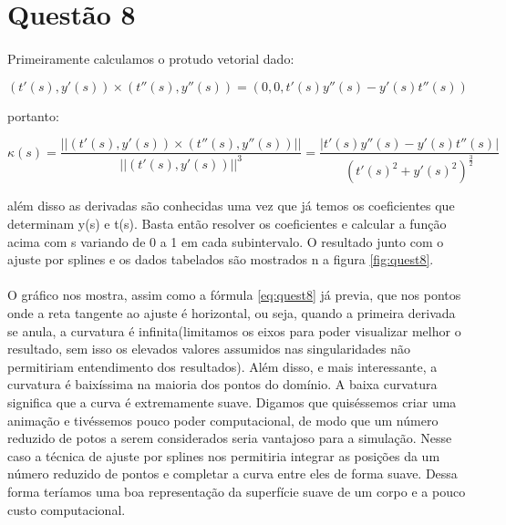 \section*{Questão 8}

\paragraph{} Primeiramente calculamos o protudo vetorial dado:

\begin{equation}
    (t'(s), y'(s)) \times  (t''(s), y''(s)) = (0,0,t'(s)y''(s) - y'(s)t''(s))
\end{equation}

portanto:

\begin{equation}
     \kappa(s) =  \frac{||(t'(s), y'(s)) \times  (t''(s), y''(s))||}{||(t'(s), y'(s))||^{3}} = 
     \frac{|t'(s)y''(s) - y'(s)t''(s)|}{(t'(s)^2 + y'(s)^2)^{\frac{3}{2}}}
    \label{eq:quest8}
\end{equation}

além disso as derivadas são conhecidas uma vez que já temos os coeficientes que determinam
y(s) e t(s). Basta então resolver os coeficientes e calcular a função acima com s variando de 0 a 1
em cada subintervalo. O resultado junto com o ajuste por splines e os dados tabelados são mostrados n
a figura \ref{fig:quest8}.

\paragraph{}O gráfico nos mostra, assim como a fórmula \ref{eq:quest8} já previa, que nos pontos
onde a reta tangente ao ajuste é horizontal, ou seja, quando a primeira derivada se anula, a curvatura
é infinita(limitamos os eixos para poder visualizar melhor o resultado, sem isso os elevados valores
assumidos nas singularidades não permitiriam entendimento dos resultados). Além disso, e mais interessante,
a curvatura é baixíssima na maioria dos pontos do domínio. A baixa curvatura significa que a curva é extremamente
suave. Digamos que quiséssemos criar uma animação e tivéssemos pouco poder computacional, de modo que um número
reduzido de potos a serem considerados seria vantajoso para a simulação. Nesse caso a técnica de ajuste por splines
nos permitiria integrar as posições da um número reduzido de pontos e completar a curva entre eles de forma suave.
Dessa forma teríamos uma boa representação da superfície suave de um corpo e a pouco custo computacional.

